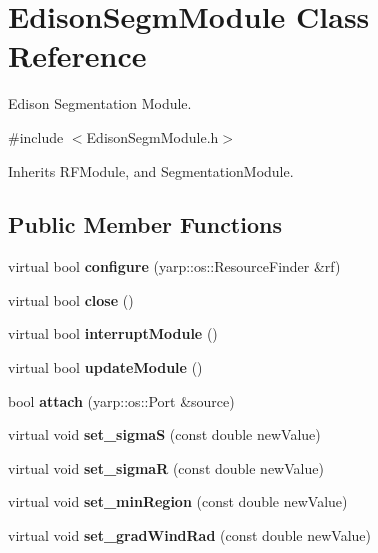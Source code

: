 \section{Edison\+Segm\+Module Class Reference}
\label{classEdisonSegmModule}


Edison Segmentation Module.  




{\ttfamily \#include $<$Edison\+Segm\+Module.\+h$>$}



Inherits R\+F\+Module, and Segmentation\+Module.

\subsection*{Public Member Functions}
\begin{DoxyCompactItemize}
\item 
\mbox{\label{classEdisonSegmModule_adff5acfcb2411234172937f50071f747}} 
virtual bool {\bfseries configure} (yarp\+::os\+::\+Resource\+Finder \&rf)
\item 
\mbox{\label{classEdisonSegmModule_a01831b02110aa3c2dfb2ae2a235f32c8}} 
virtual bool {\bfseries close} ()
\item 
\mbox{\label{classEdisonSegmModule_a050c4fd290134b2c549f1f255b39e3fa}} 
virtual bool {\bfseries interrupt\+Module} ()
\item 
\mbox{\label{classEdisonSegmModule_a9ec945c0f1cd4246d94255c9d58bbd4f}} 
virtual bool {\bfseries update\+Module} ()
\item 
\mbox{\label{classEdisonSegmModule_a1ac9b550e805a1e1dff863205b70e553}} 
bool {\bfseries attach} (yarp\+::os\+::\+Port \&source)
\item 
\mbox{\label{classEdisonSegmModule_a9331b900b7671ad851f9aa3b4159e0cf}} 
virtual void {\bfseries set\+\_\+sigmaS} (const double new\+Value)
\item 
\mbox{\label{classEdisonSegmModule_a26d36ebd0382e29033d6b4764b1cfb33}} 
virtual void {\bfseries set\+\_\+sigmaR} (const double new\+Value)
\item 
\mbox{\label{classEdisonSegmModule_a9f4a7a594ff5ee50d330cb964dd9b48f}} 
virtual void {\bfseries set\+\_\+min\+Region} (const double new\+Value)
\item 
\mbox{\label{classEdisonSegmModule_a6add88774ea4794f278988a44d4a64c2}} 
virtual void {\bfseries set\+\_\+grad\+Wind\+Rad} (const double new\+Value)
\item 
\mbox{\label{classEdisonSegmModule_a63a8a762fcad79343218570b175b755d}} 

\end{DoxyCompactItemize}
